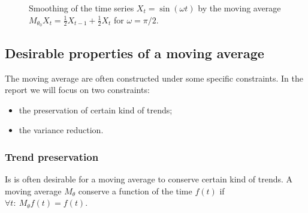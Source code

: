 \documentclass[
  12pt,
  ,
  a4paper]{article}
\newcommand\1{\mathds{1}}
\begin{document}
\begin{figure}[!ht]
\caption{Smoothing of the time series $X_t=\sin(\omega t)$ by the moving average $M_{\theta_0}X_t=\frac{1}{2}X_{t-1}+\frac{1}{2}X_{t}$ for $\omega=\pi/2$.}\label{fig:exgainPhase}
\end{figure}

\hypertarget{desirable-properties-of-a-moving-average}{%
\subsection{Desirable properties of a moving average}\label{desirable-properties-of-a-moving-average}}

The moving average are often constructed under some specific constraints.
In the report we will focus on two constraints:

\begin{itemize}
\item
  the preservation of certain kind of trends;
\item
  the variance reduction.
\end{itemize}

\hypertarget{trend-preservation}{%
\subsubsection{Trend preservation}\label{trend-preservation}}

Is is often desirable for a moving average to conserve certain kind of trends.
A moving average \(M_\theta\) conserve a function of the time \(f(t)\) if \(\forall t:\:M_\theta f(t)=f(t)\).
\end{document}
